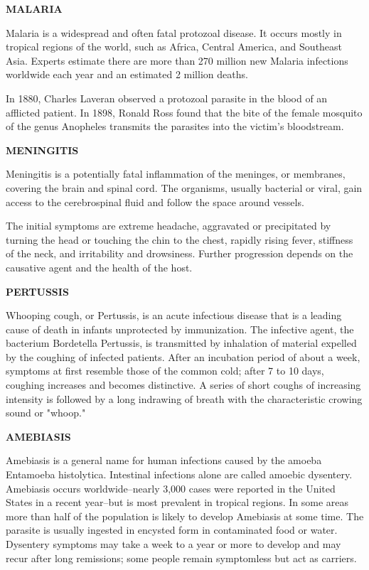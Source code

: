 

{\LARGE \bf MALARIA}

Malaria is a widespread and often fatal protozoal disease.  It
occurs mostly in tropical regions of the world, such as Africa,
Central America, and Southeast Asia.  Experts estimate there are
more than 270 million new Malaria infections worldwide each year and
an estimated 2 million deaths.

In 1880, Charles Laveran observed a 
protozoal parasite in the blood of an afflicted patient. In 
1898, Ronald Ross found that the bite of the female mosquito
of the genus Anopheles transmits the parasites into the 
victim's bloodstream. 

\newpage 
{\LARGE \bf MENINGITIS}
  
 Meningitis is a potentially fatal inflammation of the meninges,
or membranes, covering the brain and spinal cord.  The 
organisms, usually bacterial or viral, gain access to the 
cerebrospinal fluid and follow the space around vessels. 

The initial symptoms are extreme headache, aggravated or 
precipitated by turning the head or touching the chin to the 
chest, rapidly rising fever, stiffness of the neck, and 
irritability and drowsiness.  Further progression depends on 
the causative agent and the health of the host.

\newpage
{\LARGE \bf PERTUSSIS}
  
Whooping cough, or Pertussis, is an acute infectious disease 
that is a leading cause of death in infants unprotected by 
immunization. The infective agent, the bacterium Bordetella 
Pertussis, is transmitted by inhalation of material expelled 
by the coughing of infected patients. After an incubation 
period of about a week, symptoms at first resemble those of 
the common cold; after 7 to 10 days, coughing increases and 
becomes distinctive. A series of short coughs of increasing 
intensity is followed by a long indrawing of breath with the 
characteristic crowing sound or "whoop."

\newpage
{\LARGE \bf AMEBIASIS} 

  
Amebiasis is a general name for human infections caused by the 
amoeba Entamoeba histolytica.  Intestinal infections alone are 
called amoebic dysentery.  Amebiasis occurs worldwide--nearly 
3,000 cases were reported in the United States in a recent 
year--but is most prevalent in tropical regions.  In some 
areas more than half of the population is likely to develop 
Amebiasis at some time.  The parasite is usually ingested in 
encysted form in contaminated food or water.  Dysentery 
symptoms may take a week to a year or more to develop and may 
recur after long remissions;  some people remain symptomless 
but act as carriers.

